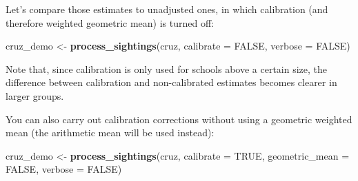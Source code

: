 \documentclass[
]{book}
\newenvironment{Shaded}{\begin{snugshade}}{\end{snugshade}}
\newcommand{\DataTypeTok}[1]{\textcolor[rgb]{0.13,0.29,0.53}{#1}}
\newcommand{\DecValTok}[1]{\textcolor[rgb]{0.00,0.00,0.81}{#1}}
\newcommand{\FloatTok}[1]{\textcolor[rgb]{0.00,0.00,0.81}{#1}}
\newcommand{\KeywordTok}[1]{\textcolor[rgb]{0.13,0.29,0.53}{\textbf{#1}}}
\newcommand{\NormalTok}[1]{#1}
\newcommand{\OperatorTok}[1]{\textcolor[rgb]{0.81,0.36,0.00}{\textbf{#1}}}
\newcommand{\OtherTok}[1]{\textcolor[rgb]{0.56,0.35,0.01}{#1}}
\newcommand{\StringTok}[1]{\textcolor[rgb]{0.31,0.60,0.02}{#1}}
\begin{document}
Let's compare those estimates to unadjusted ones, in which calibration (and therefore weighted geometric mean) is turned off:

\begin{Shaded}
\begin{Highlighting}[]
\NormalTok{cruz_demo <-}\StringTok{ }\KeywordTok{process_sightings}\NormalTok{(cruz, }
                               \DataTypeTok{calibrate =} \OtherTok{FALSE}\NormalTok{,}
                               \DataTypeTok{verbose =} \OtherTok{FALSE}\NormalTok{)}
\end{Highlighting}
\end{Shaded}

\begin{Shaded}
\end{Shaded}

Note that, since calibration is only used for schools above a certain size, the difference between calibration and non-calibrated estimates becomes clearer in larger groups.

You can also carry out calibration corrections without using a geometric weighted mean (the arithmetic mean will be used instead):

\begin{Shaded}
\begin{Highlighting}[]
\NormalTok{cruz_demo <-}\StringTok{ }\KeywordTok{process_sightings}\NormalTok{(cruz, }
                               \DataTypeTok{calibrate =} \OtherTok{TRUE}\NormalTok{,}
                               \DataTypeTok{geometric_mean =} \OtherTok{FALSE}\NormalTok{,}
                               \DataTypeTok{verbose =} \OtherTok{FALSE}\NormalTok{)}
\end{Highlighting}
\end{Shaded}
\end{document}
